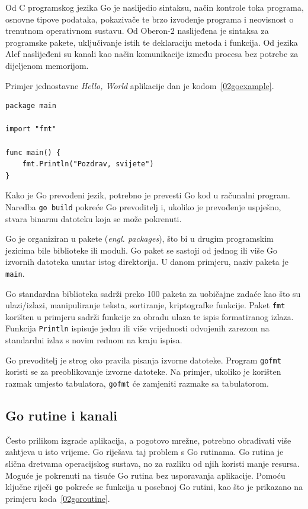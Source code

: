 Od C programskog jezika Go je naslijedio sintaksu, način kontrole toka programa, osnovne tipove
podataka, pokazivače te brzo izvođenje programa i neovisnost o trenutnom operativnom sustavu.
Od Oberon-2 naslijeđena je sintaksa za programske pakete, uključivanje istih te deklaraciju metoda
i funkcija. Od jezika Alef naslijeđeni su kanali kao način komunikacije između procesa bez potrebe
za dijeljenom memorijom.

Primjer jednostavne \textit{Hello, World} aplikacije dan je kodom~\ref{02goexample}.

\begin{lstlisting}[float=h]
package main

import "fmt"

func main() {
    fmt.Println("Pozdrav, svijete")
}
\end{lstlisting}

Kako je Go prevođeni jezik, potrebno je prevesti Go kod u računalni program. Naredba \texttt{go
build} pokreće Go prevoditelj i, ukoliko je prevođenje uspješno, stvara binarnu datoteku koja se
može pokrenuti.

Go je organiziran u pakete (\textit{engl. packages}), što bi u drugim programskim jezicima bile
biblioteke ili moduli. Go paket se sastoji od jednog ili više Go izvornih datoteka unutar istog
direktorija. U danom primjeru, naziv paketa je \texttt{main}.

Go standardna biblioteka sadrži preko 100 paketa za uobičajne zadaće kao što su ulazi/izlazi,
manipuliranje teksta, sortiranje, kriptografke funkcije. Paket \texttt{fmt} korišten u primjeru
sadrži funkcije za obradu ulaza te ispis formatiranog izlaza. Funkcija \texttt{Println} ispisuje
jednu ili više vrijednosti odvojenih zarezom na standardni izlaz s novim rednom na kraju ispisa.

Go prevoditelj je strog oko pravila pisanja izvorne datoteke. Program \texttt{gofmt} koristi se za
preoblikovanje izvorne datoteke. Na primjer, ukoliko je korišten razmak umjesto tabulatora,
\texttt{gofmt} će zamjeniti razmake sa tabulatorom.

\subsection{Go rutine i kanali}
Često prilikom izgrade aplikacija, a pogotovo mrežne, potrebno obrađivati više zahtjeva u isto
vrijeme. Go riješava taj problem s Go rutinama. Go rutina je slična dretvama operacijskog sustava,
no za razliku od njih koristi manje resursa. Moguće je pokrenuti na tisuće Go rutina bez usporavanja
aplikacije. Pomoću ključne riječi \texttt{go} pokreće se funkcija u posebnoj Go rutini, kao što je
prikazano na primjeru koda~\ref{02goroutine}.

